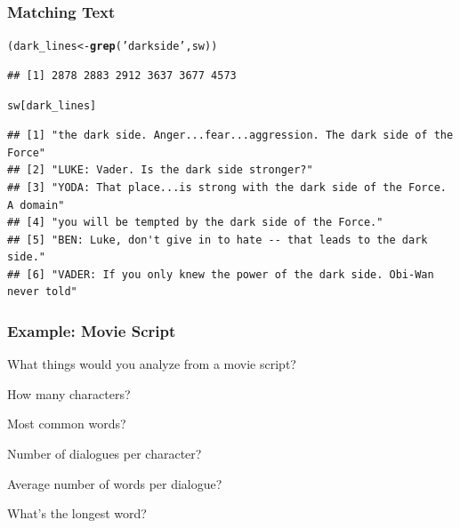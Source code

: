 \documentclass[12pt]{beamer}\usepackage[]{graphicx}\usepackage[]{color}
\makeatletter
\newcommand{\hlstr}[1]{\textcolor[rgb]{0.192,0.494,0.8}{#1}}%
\newcommand{\hlstd}[1]{\textcolor[rgb]{0.345,0.345,0.345}{#1}}%
\newcommand{\hlkwb}[1]{\textcolor[rgb]{0.69,0.353,0.396}{#1}}%
\newcommand{\hlkwd}[1]{\textcolor[rgb]{0.737,0.353,0.396}{\textbf{#1}}}%
\newenvironment{kframe}{%
 \def\at@end@of@kframe{}%
 \ifinner\ifhmode%
  \def\at@end@of@kframe{\end{minipage}}%
  \begin{minipage}{\columnwidth}%
 \fi\fi%
 \def\FrameCommand##1{\hskip\@totalleftmargin \hskip-\fboxsep
 \colorbox{shadecolor}{##1}\hskip-\fboxsep
     \hskip-\linewidth \hskip-\@totalleftmargin \hskip\columnwidth}%
 \MakeFramed {\advance\hsize-\width
   \@totalleftmargin\z@ \linewidth\hsize
   \@setminipage}}%
 {\par\unskip\endMakeFramed%
 \at@end@of@kframe}
\newenvironment{knitrout}{}{} %
\makeatother
\begin{document}

\begin{frame}[fragile]
\frametitle{Matching Text}

\begin{knitrout}\tiny
{}\color{fgcolor}\begin{kframe}
\begin{alltt}
\hlstd{(dark_lines} \hlkwb{<-} \hlkwd{grep}\hlstd{(}\hlstr{'dark side'}\hlstd{, sw))}
\end{alltt}
\begin{verbatim}
## [1] 2878 2883 2912 3637 3677 4573
\end{verbatim}
\begin{alltt}
\hlstd{sw[dark_lines]}
\end{alltt}
\begin{verbatim}
## [1] "the dark side. Anger...fear...aggression. The dark side of the Force"  
## [2] "LUKE: Vader. Is the dark side stronger?"                               
## [3] "YODA: That place...is strong with the dark side of the Force. A domain"
## [4] "you will be tempted by the dark side of the Force."                    
## [5] "BEN: Luke, don't give in to hate -- that leads to the dark side."      
## [6] "VADER: If you only knew the power of the dark side. Obi-Wan never told"
\end{verbatim}
\end{kframe}
\end{knitrout}

\end{frame}


\begin{frame}
\frametitle{Example: Movie Script}

What things would you analyze from a movie script?
\pause
\bi
  \item How many characters?
  \item Most common words?
  \item Number of dialogues per character?
  \item Average number of words per dialogue?
  \item What's the longest word?
\ei

\end{frame}

\end{document}
